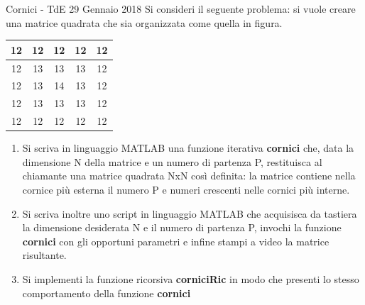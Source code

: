 \documentclass[format=169, 10pt]{beamer}
\begin{document}
\begin{frame}[allowframebreaks]{Cornici - TdE 29 Gennaio 2018}
Si consideri il seguente problema: si vuole creare una matrice quadrata che sia organizzata come quella in figura. 

\begin{tabular}{|c|c|c|c|c|}
	\hline 
	12 & 12 & 12 & 12 & 12 \\ 
	\hline 
	12 & 13 & 13 & 13 & 12 \\ 
	\hline 
	12 & 13 & 14 & 13 & 12 \\ 
	\hline 
	12 & 13 & 13 & 13 & 12 \\ 
	\hline 
	12 & 12 & 12 & 12 & 12 \\ 
	\hline 
\end{tabular} 

\begin{enumerate}
\item Si scriva in linguaggio MATLAB una funzione \alert{iterativa} \textbf{cornici} che, data la dimensione N della matrice e un numero di partenza P, restituisca al chiamante una matrice quadrata NxN così definita: la matrice contiene nella cornice più esterna il numero P e numeri crescenti nelle cornici più interne.

\item Si scriva inoltre uno script in linguaggio MATLAB che acquisisca da tastiera la dimensione desiderata N e il numero di partenza P, invochi la funzione \textbf{cornici} con gli opportuni parametri e infine stampi a video la matrice risultante.

\item Si implementi la funzione \alert{ricorsiva} \textbf{corniciRic} in modo che presenti lo stesso comportamento della funzione \textbf{cornici}
\end{enumerate}
\end{frame}
\end{document}
